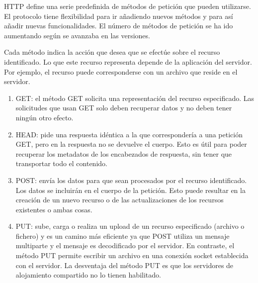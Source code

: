 HTTP define una serie predefinida de métodos de petición que pueden utilizarse. El protocolo tiene flexibilidad para ir añadiendo nuevos métodos y para así añadir nuevas funcionalidades. El número de métodos de petición se ha ido aumentando según se avanzaba en las versiones.


 Cada método indica la acción que desea que se efectúe sobre el recurso identificado. Lo que este recurso representa depende de la aplicación del servidor. Por ejemplo, el recurso puede corresponderse con un archivo que reside en el servidor.

\begin{enumerate}
    \item GET: el método GET solicita una representación del recurso especificado. Las solicitudes que usan GET solo deben recuperar datos y no deben tener ningún otro efecto. 
    \item HEAD: pide una respuesta idéntica a la que correspondería a una petición GET, pero en la respuesta no se devuelve el cuerpo. Esto es útil para poder recuperar los metadatos de los encabezados de respuesta, sin tener que transportar todo el contenido.
    \item POST: envía los datos para que sean procesados por el recurso identificado. Los datos se incluirán en el cuerpo de la petición. Esto puede resultar en la creación de un nuevo recurso o de las actualizaciones de los recursos existentes o ambas cosas.
    \item PUT:  sube, carga o realiza un upload de un recurso especificado (archivo o fichero) y es un camino más eficiente ya que POST utiliza un mensaje multiparte y el mensaje es decodificado por el servidor. En contraste, el método PUT permite escribir un archivo en una conexión socket establecida con el servidor. La desventaja del método PUT es que los servidores de alojamiento compartido no lo tienen habilitado.
\end{enumerate}